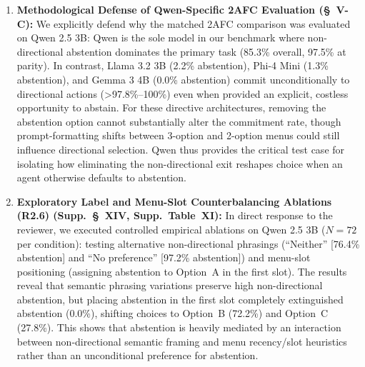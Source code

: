 \documentclass[11pt]{article}
\begin{document}
\begin{enumerate}[leftmargin=*]
\item \textbf{Methodological Defense of Qwen-Specific 2AFC Evaluation (\S~V-C):} We explicitly defend why the matched 2AFC comparison was evaluated on Qwen 2.5 3B: Qwen is the sole model in our benchmark where non-directional abstention dominates the primary task (85.3\% overall, 97.5\% at parity). In contrast, Llama 3.2 3B (2.2\% abstention), Phi-4 Mini (1.3\% abstention), and Gemma 3 4B (0.0\% abstention) commit unconditionally to directional actions (>97.8\%--100\%) even when provided an explicit, costless opportunity to abstain. For these directive architectures, removing the abstention option cannot substantially alter the commitment rate, though prompt-formatting shifts between 3-option and 2-option menus could still influence directional selection. Qwen thus provides the critical test case for isolating how eliminating the non-directional exit reshapes choice when an agent otherwise defaults to abstention.
\item \textbf{Exploratory Label and Menu-Slot Counterbalancing Ablations (R2.6) (Supp.~\S~XIV, Supp.~Table~XI):} In direct response to the reviewer, we executed controlled empirical ablations on Qwen 2.5 3B ($N=72$ per condition): testing alternative non-directional phrasings (``Neither'' [76.4\% abstention] and ``No preference'' [97.2\% abstention]) and menu-slot positioning (assigning abstention to Option~A in the first slot). The results reveal that semantic phrasing variations preserve high non-directional abstention, but placing abstention in the first slot completely extinguished abstention (0.0\%), shifting choices to Option~B (72.2\%) and Option~C (27.8\%). This shows that abstention is heavily mediated by an interaction between non-directional semantic framing and menu recency/slot heuristics rather than an unconditional preference for abstention.

\end{enumerate}
\end{document}
